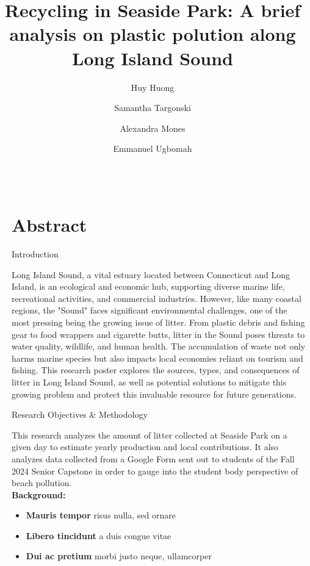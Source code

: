 \documentclass[final]{beamer}
\title{Recycling in Seaside Park: A brief analysis on plastic polution along Long Island Sound}
\author{Huy Huong\inst{1} \and Samantha Targonski\inst{1} \and Alexandra Mones\inst{2} \and Emmanuel Ugbomah\inst{2}}
\institute[UB]{Senior Capstone}
\newlength{\sepwidth}
\newlength{\colwidth}
\newcommand{\separatorcolumn}{\begin{column}{\sepwidth}\end{column}}
\begin{document}
  \begin{frame}[t]
    \begin{columns}[t]
      \separatorcolumn

      \begin{column}{\colwidth}
        \section{Abstract}
        \begin{block}{Introduction}

          Long Island Sound, a vital estuary located between Connecticut and Long Island, is an ecological and economic hub, supporting diverse marine life, recreational activities, and commercial industries. However, like many coastal regions, the "Sound" faces significant environmental challenges, one of the most pressing being the growing issue of litter. From plastic debris and fishing gear to food wrappers and cigarette butts, litter in the Sound poses threats to water quality, wildlife, and human health. The accumulation of waste not only harms marine species but also impacts local economies reliant on tourism and fishing. This research poster explores the sources, types, and consequences of litter in Long Island Sound, as well as potential solutions to mitigate this growing problem and protect this invaluable resource for future generations. \cite{STS_CT_Cleanup}

        \end{block}

        \begin{block}{Research Objectives \& Methodology}

          This research analyzes the amount of litter collected at Seaside Park on a given day to estimate yearly production and local contributions. It also analyzes data collected from a Google Form sent out to students of the Fall 2024 Senior Capstone in order to gauge into the student body perspective of beach pollution.
          \\
          \textbf{Background:}
            \begin{itemize}
              \item \textbf{Mauris tempor} risus nulla, sed ornare
              \item \textbf{Libero tincidunt} a duis congue vitae
              \item \textbf{Dui ac pretium} morbi justo neque, ullamcorper
            \end{itemize}


\end{block}
\end{column}
\end{columns}
\end{frame}
\end{document}
